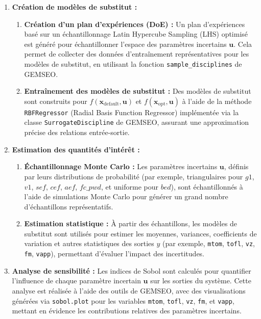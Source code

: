 \documentclass[a4paper, 11pt]{article}
\begin{document}
\begin{enumerate}
    \item \textbf{Création de modèles de substitut :}
    \begin{enumerate}
        \item \textbf{Création d’un plan d’expériences (DoE) :} Un plan d’expériences basé sur un échantillonnage Latin Hypercube Sampling (LHS) optimisé est généré pour échantillonner l’espace des paramètres incertains \( \mathbf{u} \). Cela permet de collecter des données d’entraînement représentatives pour les modèles de substitut, en utilisant la fonction \texttt{sample\_disciplines} de GEMSEO.
        \item \textbf{Entraînement des modèles de substitut :} Des modèles de substitut sont construits pour \( f(\mathbf{x}_{\text{default}}, \mathbf{u}) \) et \( f(\mathbf{x}_{\text{opt}}, \mathbf{u}) \) à l’aide de la méthode \texttt{RBFRegressor} (Radial Basis Function Regressor) implémentée via la classe \texttt{SurrogateDiscipline} de GEMSEO, assurant une approximation précise des relations entrée-sortie.
    \end{enumerate}

    \item \textbf{Estimation des quantités d’intérêt :}
    \begin{enumerate}
        \item \textbf{Échantillonnage Monte Carlo :} Les paramètres incertains \( \mathbf{u} \), définis par leurs distributions de probabilité (par exemple, triangulaires pour \( g1 \), \( v1 \), \( sef \), \( cef \), \( aef \), \( fc\_pwd \), et uniforme pour \( bed \)), sont échantillonnés à l’aide de simulations Monte Carlo pour générer un grand nombre d’échantillons représentatifs.
        \item \textbf{Estimation statistique :} À partir des échantillons, les modèles de substitut sont utilisés pour estimer les moyennes, variances, coefficients de variation et autres statistiques des sorties \( y \) (par exemple, \texttt{mtom}, \texttt{tofl}, \texttt{vz}, \texttt{fm}, \texttt{vapp}), permettant d’évaluer l’impact des incertitudes.
    \end{enumerate}

    \item \textbf{Analyse de sensibilité :} Les indices de Sobol sont calculés pour quantifier l’influence de chaque paramètre incertain \( \mathbf{u} \) sur les sorties du système. Cette analyse est réalisée à l’aide des outils de GEMSEO, avec des visualisations générées via \texttt{sobol.plot} pour les variables \texttt{mtom}, \texttt{tofl}, \texttt{vz}, \texttt{fm}, et \texttt{vapp}, mettant en évidence les contributions relatives des paramètres incertains.
\end{enumerate}
\end{document}
